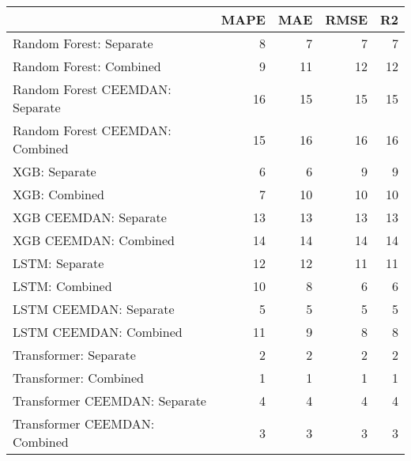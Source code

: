\begin{tabular}{lrrrr}
\toprule
{} &  MAPE &  MAE &  RMSE &  R2 \\
\midrule
Random Forest: Separate         &     8 &    7 &     7 &   7 \\
Random Forest: Combined         &     9 &   11 &    12 &  12 \\
Random Forest CEEMDAN: Separate &    16 &   15 &    15 &  15 \\
Random Forest CEEMDAN: Combined &    15 &   16 &    16 &  16 \\
XGB: Separate                   &     6 &    6 &     9 &   9 \\
XGB: Combined                   &     7 &   10 &    10 &  10 \\
XGB CEEMDAN: Separate           &    13 &   13 &    13 &  13 \\
XGB CEEMDAN: Combined           &    14 &   14 &    14 &  14 \\
LSTM: Separate                  &    12 &   12 &    11 &  11 \\
LSTM: Combined                  &    10 &    8 &     6 &   6 \\
LSTM CEEMDAN: Separate          &     5 &    5 &     5 &   5 \\
LSTM CEEMDAN: Combined          &    11 &    9 &     8 &   8 \\
Transformer: Separate           &     2 &    2 &     2 &   2 \\
Transformer: Combined           &     1 &    1 &     1 &   1 \\
Transformer CEEMDAN: Separate   &     4 &    4 &     4 &   4 \\
Transformer CEEMDAN: Combined   &     3 &    3 &     3 &   3 \\
\bottomrule
\end{tabular}
